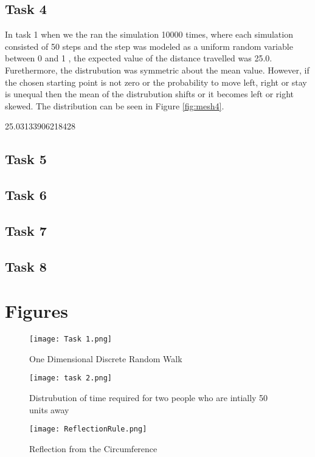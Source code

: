 \documentclass[a4paper, 11pt]{book} %
\begin{document}
\subsection*{Task 4}

In task 1 when we the ran the simulation 10000 times, where each simulation consisted of 50 steps and the step was modeled as a uniform random variable between 0 and 1 , the expected value of the distance travelled was 25.0.
Furethermore, the distrubution was symmetric about the mean value. However, if the chosen starting point is not zero or the probability to move left, right or stay is unequal then the mean of the distrubution shifts or it becomes left or right skewed. The distribution can be seen in Figure \ref{fig:mesh4}.


25.03133906218428


\subsection*{Task 5}

\subsection*{Task 6}


\subsection*{Task 7}

\subsection*{Task 8}



\cleardoublepage

\section*{Figures}
\begin{figure}[h]
	\centering
	\texttt{[image: Task 1.png]}
	\caption{One Dimensional Discrete Random Walk}
	\label{fig:mesh1}
\end{figure}

\begin{figure}[h]
	\centering
	\texttt{[image: task 2.png]}
	\caption{Distrubution of time required for two people who are intially 50 units away}
	\label{fig:mesh2}
\end{figure}
\begin{figure}[h]
	\centering
	\texttt{[image: ReflectionRule.png]}
	\caption{Reflection from the Circumference}
	\label{fig:mesh3}
\end{figure}
\end{document}
